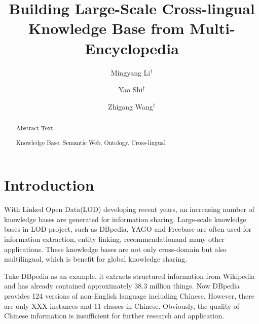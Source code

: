 \documentclass[runningheads,a4paper]{llncs}
\newcommand{\keywords}[1]{\par\addvspace\baselineskip\noindent\keywordname\enspace\ignorespaces#1}
\begin{document}
\mainmatter

\title{Building Large-Scale Cross-lingual Knowledge Base from Multi-Encyclopedia}
\author{Mingyang Li$^\dag$ \and Yao Shi$^\dag$ \and Zhigang Wang$^\dag$}


\maketitle

\begin{abstract}
    Abstract Text

\keywords{Knowledge Base, Semantic Web, Ontology, Cross-lingual}
\end{abstract}

\section{Introduction}
With Linked Open Data(LOD) developing recent years, an increasing number of knowledge bases are generated for information sharing. Large-scale knowledge bases in LOD project, such as DBpedia\cite{mendes2012dbpedia}, YAGO\cite{mahdisoltani2014yago3} and Freebase\cite{bollacker2008freebase} are often used for information extraction\cite{dutta2013integrating}, entity linking\cite{shen2012linden}, recommendation\cite{passant2010dbrec,fernandez2011generic,kaminskas2012knowledge}and many other applications. These knowledge bases are not only cross-domain but also multilingual, which is benefit for global knowledge sharing.

Take DBpedia as an example, it extracts structured information from Wikipedia and has already contained approximately 38.3 million things. Now DBpedia provides 124 versions of non-English language including Chinese. However, there are only XXX instances and 11 classes in Chinese. Obviously, the quality of Chinese information is insufficient for further research and application.
\end{document}
